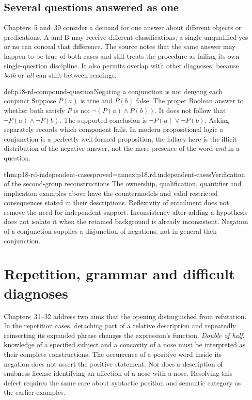 \subsection{Several questions answered as one}

Chapters~5 and~30 consider a demand for one answer about different
objects or predications. A and B may receive different classifications;
a single unqualified yes or no can conceal that difference. The source
notes that the same answer may happen to be true of both cases and
still treats the procedure as failing its own single-question discipline.
It also permits overlap with other diagnoses, because \emph{both}
or \emph{all} can shift between readings.

\begin{hbexample}{def:p18-rd-compound-question}{Negating a conjunction is not denying each conjunct}
Suppose \(P(a)\) is true and \(P(b)\) false. The proper Boolean
answer to whether both satisfy \(P\) is no:
\(\neg(P(a)\land P(b))\). It does not follow that
\(\neg P(a)\land\neg P(b)\). The supported conclusion is
\(\neg P(a)\lor\neg P(b)\). Asking separately records which
component fails. In modern propositional logic a conjunction is a
perfectly well-formed proposition; the fallacy here is the illicit
distribution of the negative answer, not the mere presence of the
word \emph{and} in a question.
\end{hbexample}

\begin{hblemma}{thm:p18-rd-independent-cases}{proved=annex:p18.rd.independent-cases}{Verification of the second-group reconstructions}
The ownership, qualification, quantifier and implication examples above
have the countermodels and valid restricted consequences stated in
their descriptions. Reflexivity of entailment does not remove the
need for independent support. Inconsistency after adding a hypothesis
does not isolate it when the retained background is already inconsistent.
Negation of a conjunction supplies a disjunction of negations, not
in general their conjunction.
\end{hblemma}

\section{Repetition, grammar and difficult diagnoses}

Chapters~31--32 address two aims that the opening distinguished from
refutation. In the repetition cases, detaching part of a relative
description and repeatedly reinserting its expanded phrase changes
the expression's function. \emph{Double of half}, knowledge of a
specified subject and a concavity of a nose must be interpreted as
their complete constructions. The occurrence of a positive word inside
its negation does not assert the positive statement. Nor does a
description of snubness license identifying an affection of a nose
with a nose. Resolving this defect requires the same care about
syntactic position and semantic category as the earlier examples.

